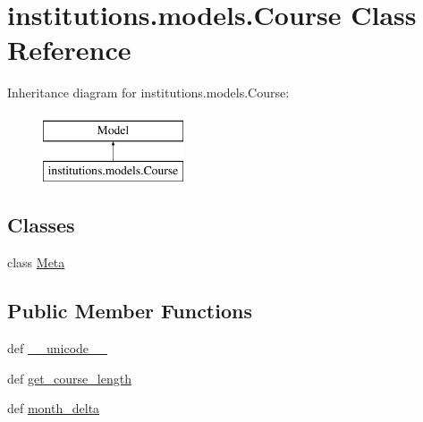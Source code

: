 \hypertarget{classinstitutions_1_1models_1_1_course}{\section{institutions.\-models.\-Course Class Reference}
\label{classinstitutions_1_1models_1_1_course}
}
Inheritance diagram for institutions.\-models.\-Course\-:\begin{figure}[H]
\begin{center}
\leavevmode
\includegraphics[height=2.000000cm]{classinstitutions_1_1models_1_1_course}
\end{center}
\end{figure}
\subsection*{Classes}
\begin{DoxyCompactItemize}
\item 
class \hyperlink{classinstitutions_1_1models_1_1_course_1_1_meta}{Meta}
\end{DoxyCompactItemize}
\subsection*{Public Member Functions}
\begin{DoxyCompactItemize}
\item 
def \hyperlink{classinstitutions_1_1models_1_1_course_ae81a94eaf906ab63a9356bd782a1275d}{\-\_\-\-\_\-unicode\-\_\-\-\_\-}
\item 
def \hyperlink{classinstitutions_1_1models_1_1_course_a554d8e8da0e728a3238a0423ea252fe8}{get\-\_\-course\-\_\-length}
\item 
def \hyperlink{classinstitutions_1_1models_1_1_course_a5ee420530f9580169688ef54e72d96c5}{month\-\_\-delta}
\end{DoxyCompactItemize}
